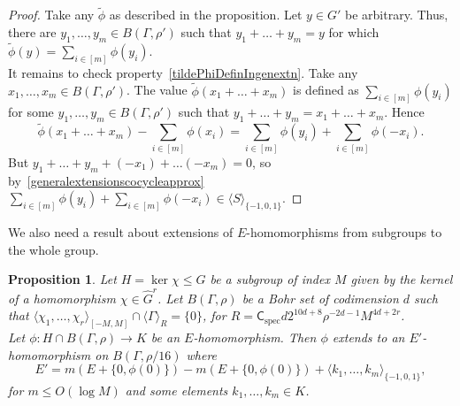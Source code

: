\documentclass[a4paper,11pt]{article}
\numberwithin{theorem}{section}
\newtheorem{proposition}[theorem]{Proposition}
\theoremstyle{definition}
\newcommand{\on}[1]{
	\operatorname{#1}
}
\begin{document}
\begin{proof}
    Take any $\tilde{\phi}$ as described in the proposition. Let $y \in G'$ be arbitrary. Thus, there are $y_1, \dots, y_m \in B(\Gamma, \rho')$ such that $y_1 + \dots + y_m = y$ for which $\tilde{\phi}(y) = \sum_{i \in [m]} \phi(y_i)$.\\
    \indent It remains to check property~\eqref{tildePhiDefinIngenextn}. Take any $x_1, \dots, x_m \in B(\Gamma, \rho')$. The value $\tilde{\phi}(x_1 + \dots + x_m)$ is defined as  $\sum_{i \in [m]} \phi(y_i)$ for some $y_1, \dots, y_m \in B(\Gamma, \rho')$ such that $y_1 + \dots + y_m = x_1 + \dots + x_m$. Hence
    \[\tilde{\phi}(x_1 + \dots + x_m) - \sum_{i \in [m]} \phi(x_i) = \sum_{i \in [m]} \phi(y_i) + \sum_{i \in [m]} \phi(-x_i).\]
    But $y_1 + \dots + y_m + (-x_1) + \dots (-x_m) = 0$, so by~\eqref{generalextensionscocycleapprox}  $\sum_{i \in [m]} \phi(y_i) + \sum_{i \in [m]} \phi(-x_i) \in \langle S \rangle_{\{-1, 0, 1\}}$.
\end{proof}

\vspace{\baselineskip}





We also need a result about extensions of $E$-homomorphisms from subgroups to the whole group.

\begin{proposition}\label{ehomextensionsfromsubgroups}
    Let $H = \ker \chi \leq G$ be a subgroup of index $M$ given by the kernel of a homomorphism $\chi \in \hat{G}^r$. Let $B(\Gamma, \rho)$ be a Bohr set of codimension $d$ such that $\langle\chi_1, \dots, \chi_r \rangle_{[-M, M]} \cap \langle \Gamma \rangle_R = \{0\}$, for $R = \mathsf{C}_{\on{spec}} d 2^{10d + 8} \rho^{-2d-1} M^{4d + 2r}$.\\
    \indent Let $\phi : H \cap B(\Gamma, \rho) \to K$ be an $E$-homomorphism. Then $\phi$ extends to an $E'$-homomorphism on $B(\Gamma, \rho/16)$ where
    \[E' = m (E + \{0, \phi(0)\}) - m (E + \{0, \phi(0)\}) + \langle k_1, \dots, k_m \rangle_{\{-1, 0,1\}},\] for $m \leq O(\log M)$ and some elements $k_1, \dots, k_m \in K$.
\end{proposition}
\end{document}
